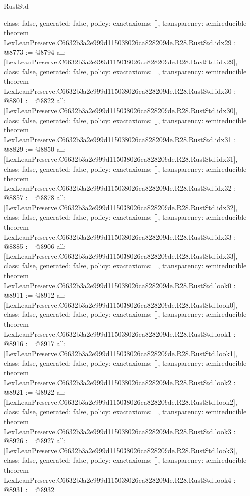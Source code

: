 \begin{lexlean}{RustStd}
\begin{coremodule}
{  class: false,
  generated: false,
  policy: exact{axioms: []},
  transparency: semireducible
}
theorem LexLeanPreserve.C6632b3a2e999d115038026ca828209de.R28.RustStd.idx29 : @8773 := @8794 {
  all: [LexLeanPreserve.C6632b3a2e999d115038026ca828209de.R28.RustStd.idx29],
  class: false,
  generated: false,
  policy: exact{axioms: []},
  transparency: semireducible
}
theorem LexLeanPreserve.C6632b3a2e999d115038026ca828209de.R28.RustStd.idx30 : @8801 := @8822 {
  all: [LexLeanPreserve.C6632b3a2e999d115038026ca828209de.R28.RustStd.idx30],
  class: false,
  generated: false,
  policy: exact{axioms: []},
  transparency: semireducible
}
theorem LexLeanPreserve.C6632b3a2e999d115038026ca828209de.R28.RustStd.idx31 : @8829 := @8850 {
  all: [LexLeanPreserve.C6632b3a2e999d115038026ca828209de.R28.RustStd.idx31],
  class: false,
  generated: false,
  policy: exact{axioms: []},
  transparency: semireducible
}
theorem LexLeanPreserve.C6632b3a2e999d115038026ca828209de.R28.RustStd.idx32 : @8857 := @8878 {
  all: [LexLeanPreserve.C6632b3a2e999d115038026ca828209de.R28.RustStd.idx32],
  class: false,
  generated: false,
  policy: exact{axioms: []},
  transparency: semireducible
}
theorem LexLeanPreserve.C6632b3a2e999d115038026ca828209de.R28.RustStd.idx33 : @8885 := @8906 {
  all: [LexLeanPreserve.C6632b3a2e999d115038026ca828209de.R28.RustStd.idx33],
  class: false,
  generated: false,
  policy: exact{axioms: []},
  transparency: semireducible
}
theorem LexLeanPreserve.C6632b3a2e999d115038026ca828209de.R28.RustStd.look0 : @8911 := @8912 {
  all: [LexLeanPreserve.C6632b3a2e999d115038026ca828209de.R28.RustStd.look0],
  class: false,
  generated: false,
  policy: exact{axioms: []},
  transparency: semireducible
}
theorem LexLeanPreserve.C6632b3a2e999d115038026ca828209de.R28.RustStd.look1 : @8916 := @8917 {
  all: [LexLeanPreserve.C6632b3a2e999d115038026ca828209de.R28.RustStd.look1],
  class: false,
  generated: false,
  policy: exact{axioms: []},
  transparency: semireducible
}
theorem LexLeanPreserve.C6632b3a2e999d115038026ca828209de.R28.RustStd.look2 : @8921 := @8922 {
  all: [LexLeanPreserve.C6632b3a2e999d115038026ca828209de.R28.RustStd.look2],
  class: false,
  generated: false,
  policy: exact{axioms: []},
  transparency: semireducible
}
theorem LexLeanPreserve.C6632b3a2e999d115038026ca828209de.R28.RustStd.look3 : @8926 := @8927 {
  all: [LexLeanPreserve.C6632b3a2e999d115038026ca828209de.R28.RustStd.look3],
  class: false,
  generated: false,
  policy: exact{axioms: []},
  transparency: semireducible
}
theorem LexLeanPreserve.C6632b3a2e999d115038026ca828209de.R28.RustStd.look4 : @8931 := @8932 {
}
\end{coremodule}
\end{lexlean}

